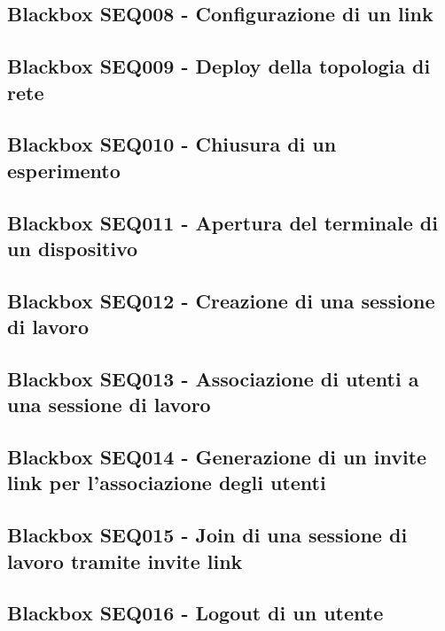 \documentclass[../main.tex]{subfiles}
\begin{document}
\subsection{Blackbox SEQ008 - Configurazione di un link }
\figure[H]
\centering

\endfigure
\vfill\newpage
\subsection{Blackbox SEQ009 - Deploy della topologia di rete }
\figure[H]
\centering

\endfigure
\vfill\newpage
\subsection{Blackbox SEQ010 - Chiusura di un esperimento }
\figure[H]
\centering

\endfigure
\vfill\newpage
\subsection{Blackbox SEQ011 - Apertura del terminale di un dispositivo }
\figure[H]
\centering

\endfigure
\vfill\newpage
\subsection{Blackbox SEQ012 - Creazione di una sessione di lavoro }
\figure[H]
\centering

\endfigure
\vfill\newpage
\subsection{Blackbox SEQ013 - Associazione di utenti a una sessione di lavoro }
\figure[H]
\centering

\endfigure
\vfill\newpage
\subsection{Blackbox SEQ014 - Generazione di un invite link per l'associazione degli utenti }
\figure[H]
\centering

\endfigure
\vfill\newpage
\subsection{Blackbox SEQ015 - Join di una sessione di lavoro tramite invite link }
\figure[H]
\centering

\endfigure
\vfill\newpage
\subsection{Blackbox SEQ016 - Logout di un utente }
\figure[H]
\centering

\endfigure
\end{document}
